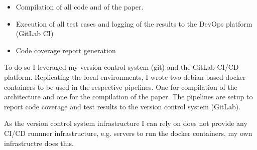 \begin{itemize}
  \item Compilation of all code and of the paper.  
  \item Execution of all test cases and logging of the results to the DevOps platform (GitLab CI)
  \item Code coverage report generation
\end{itemize}

To do so I leveraged my version control system (git) and the GitLab CI/CD platform. Replicating the local environments, I wrote two debian based docker containers \cite{dockerVerilator} \cite{dockerLatex} to be used in the respective pipelines. One for compilation of the architecture and one for the compilation of the paper. The pipelines are setup to report code coverage and test results to the version control system (GitLab). 

As the version control system infrastructure I can rely on does not provide any CI/CD runnner infrastructure, e.g. servers to run the docker containers, my own infrastructre does this.



